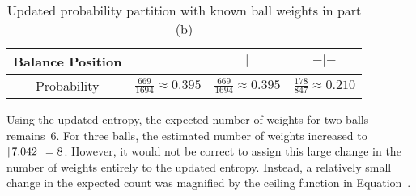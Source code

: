   \begin{table}
    \centering
    \caption{Updated probability partition with known ball weights in part (b)}\label{tab:twoBallProbabilityBreakdownKnownWeights}
    \begin{tabular}{|c||c|c|c|}
      \hline
      Balance Position & $\bar{~}\bar{~}|\underline{~~}$  & $\underline{~~}|\bar{~}\bar{~}$  & $-|-$ \\\hline
      Probability      & $\frac{669}{1694} \approx 0.395$ & $\frac{669}{1694} \approx 0.395$ & $\frac{178}{847} \approx 0.210$   \\\hline
    \end{tabular}
  \end{table}

  Using the updated entropy, the expected number of weights for two balls remains~6.  For three balls, the estimated number of weights increased to~${\ceil*{7.042} = 8}$.  However, it would not be correct to assign this large change in the number of weights entirely to the updated entropy.  Instead, a relatively small change in the expected count was magnified by the ceiling function in Equation~.


